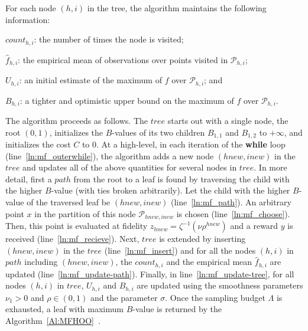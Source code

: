 \documentclass[11pt]{article}
\theoremstyle{definition}
\newcommand{\observ}{y}
\newcommand{\partition}[2]{{\mathcal{P}_{#1,#2}}}
\newcommand{\counter}[2]{{\mathit{count}_{#1,#2}}}
\begin{document}
For each node $(h,i)$ in the tree, the algorithm maintains the following information:
\begin{inparaenum}[(i)]
\item $\counter{h}{i}$: the number of times the node is visited;
\item $\hat{f}_{h,i}$: the empirical mean of observations  over points visited in $\partition{h}{i}$; \item   $U_{h,i}$: an initial estimate of the maximum of $f$ over $\partition{h}{i}$; and
\item $B_{h,i}$: a tighter and optimistic upper bound on the maximum of $f$ over $\partition{h}{i}.$
\end{inparaenum}
%

The algorithm proceeds as follows. The $\mathit{tree}$ starts out with a single node, the root $(0,1)$, initializes the $B$-values of its two children $B_ {1,1}$ and $B_{1,2}$ to $+\infty$, and initializes the cost $C$ to $0$. At a high-level, in each iteration of the \textbf{while} loop (line~\ref{ln:mf_outerwhile}), the algorithm adds a new node $(\mathit{hnew},\mathit{inew})$ in the $\mathit{tree}$ and updates all of the above quantities for several nodes in  $\mathit{tree}$. In more detail, first a $\mathit{path}$ from the root to a leaf is found by traversing the child with the higher $B$-value (with ties broken arbitrarily). Let the child with the higher $B$-value of the traversed leaf  be $(\mathit{hnew},\mathit{inew})$ (line~\ref{ln:mf_path}). An arbitrary point $x$ in the partition of this node $\partition{\mathit{hnew}}{\mathit{inew}}$ is chosen (line~\ref{ln:mf_choose}). Then, this point is evaluated at fidelity $z_{hnew}=\zeta^{-1}(\nu\rho^{hnew})$ and a reward $\observ$ is received (line~\ref{ln:mf_recieve}). Next, $\mathit{tree}$ is extended by inserting $(\mathit{hnew},\mathit{inew})$ in the $\mathit{tree}$ (line~\ref{ln:mf_insert}) and for all the nodes $(h,i)$ in $\mathit{path}$ including $(\mathit{hnew},\mathit{inew})$, the $\counter{h}{i}$ and the empirical mean $\hat{f}_{h,i}$ are updated (line~\ref{ln:mf_update-path}). Finally, in line~\ref{ln:mf_update-tree}, for all nodes $(h,i)$ in $\mathit{tree}$, $U_{h,i}$  and $B_{h,i}$ are updated using the smoothness parameters $\nu_{1}>0$ and $\rho\in(0,1)$ and the parameter $\sigma$. Once the sampling budget $\Lambda$ is exhausted, a leaf with maximum $B$-value is returned by the Algorithm~\ref{Al:MFHOO}~\cite{sen2019noisy}.
\end{document}
